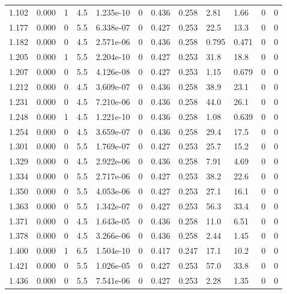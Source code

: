 \documentclass[preview]{standalone}
\begin{document}
{{{\begin{tabular}{L{1.2cm}C{1.2cm} C{0.3cm}C{0.5cm} C{1.4cm}C{1.4cm} C{1.4cm}C{1.4cm} C{1.6cm}C{1.6cm} C{1.6cm}C{1.6cm}}
  1.102  &  0.000  & 1     & 4.5 &  1.235e-10  & 0  &  0.436&   0.258& 2.81 & 1.66   &  0 & 0  \\ 
  1.177  &  0.000  & 0     & 5.5 &  6.338e-07  & 0  &  0.427&   0.253& 22.5 & 13.3   &  0 & 0  \\ 
  1.182  &  0.000  & 0     & 4.5 &  2.571e-06  & 0  &  0.436&   0.258& 0.795 & 0.471   &  0 & 0  \\ 
  1.205  &  0.000  & 1     & 5.5 &  2.204e-10  & 0  &  0.427&   0.253& 31.8 & 18.8   &  0 & 0  \\ 
  1.207  &  0.000  & 0     & 5.5 &  4.126e-08  & 0  &  0.427&   0.253& 1.15 & 0.679   &  0 & 0  \\ 
  1.212  &  0.000  & 0     & 4.5 &  3.609e-07  & 0  &  0.436&   0.258& 38.9 & 23.1   &  0 & 0  \\ 
  1.231  &  0.000  & 0     & 4.5 &  7.210e-06  & 0  &  0.436&   0.258& 44.0 & 26.1   &  0 & 0  \\ 
  1.248  &  0.000  & 1     & 4.5 &  1.221e-10  & 0  &  0.436&   0.258& 1.08 & 0.639   &  0 & 0  \\ 
  1.254  &  0.000  & 0     & 4.5 &  3.659e-07  & 0  &  0.436&   0.258& 29.4 & 17.5   &  0 & 0  \\ 
  1.301  &  0.000  & 0     & 5.5 &  1.769e-07  & 0  &  0.427&   0.253& 25.7 & 15.2   &  0 & 0  \\ 
  1.329  &  0.000  & 0     & 4.5 &  2.922e-06  & 0  &  0.436&   0.258& 7.91 & 4.69   &  0 & 0  \\ 
  1.334  &  0.000  & 0     & 5.5 &  2.717e-06  & 0  &  0.427&   0.253& 38.2 & 22.6   &  0 & 0  \\ 
  1.350  &  0.000  & 0     & 5.5 &  4.053e-06  & 0  &  0.427&   0.253& 27.1 & 16.1   &  0 & 0  \\ 
  1.363  &  0.000  & 0     & 5.5 &  1.342e-07  & 0  &  0.427&   0.253& 56.3 & 33.4   &  0 & 0  \\ 
  1.371  &  0.000  & 0     & 4.5 &  1.643e-05  & 0  &  0.436&   0.258& 11.0 & 6.51   &  0 & 0  \\ 
  1.378  &  0.000  & 0     & 4.5 &  3.266e-06  & 0  &  0.436&   0.258& 2.44 & 1.45   &  0 & 0  \\ 
  1.400  &  0.000  & 1     & 6.5 &  1.504e-10  & 0  &  0.417&   0.247& 17.1 & 10.2   &  0 & 0  \\ 
  1.421  &  0.000  & 0     & 5.5 &  1.026e-05  & 0  &  0.427&   0.253& 57.0 & 33.8   &  0 & 0  \\ 
  1.436  &  0.000  & 0     & 5.5 &  7.541e-06  & 0  &  0.427&   0.253& 2.28 & 1.35   &  0 & 0  \\ 

\end{tabular}}}}
\end{document}
